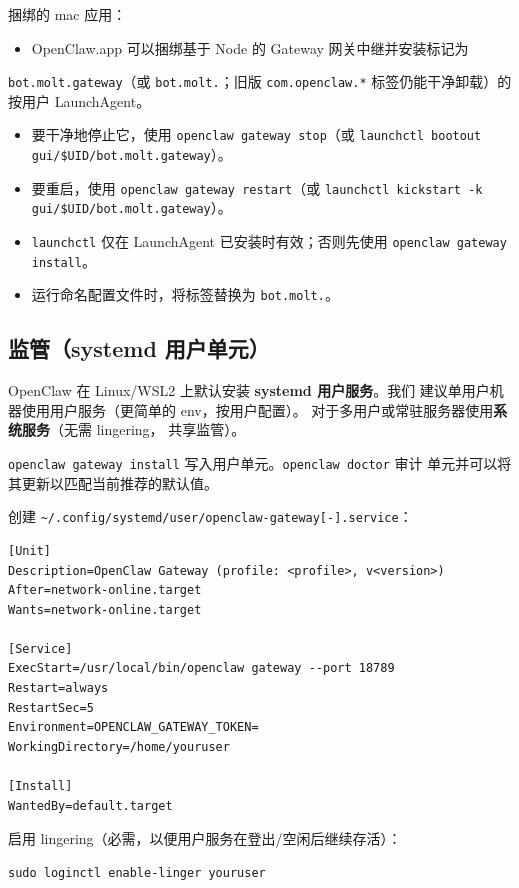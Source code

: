 捆绑的 mac 应用：

\begin{itemize}
  \item OpenClaw.app 可以捆绑基于 Node 的 Gateway 网关中继并安装标记为
\end{itemize}

\texttt{bot.molt.gateway}（或 \texttt{bot.molt.}；旧版 \texttt{com.openclaw.*} 标签仍能干净卸载）的按用户 LaunchAgent。
\begin{itemize}
  \item 要干净地停止它，使用 \texttt{openclaw gateway stop}（或 \texttt{launchctl bootout gui/\$UID/bot.molt.gateway}）。
  \item 要重启，使用 \texttt{openclaw gateway restart}（或 \texttt{launchctl kickstart -k gui/\$UID/bot.molt.gateway}）。
  \item \texttt{launchctl} 仅在 LaunchAgent 已安装时有效；否则先使用 \texttt{openclaw gateway install}。
  \item 运行命名配置文件时，将标签替换为 \texttt{bot.molt.}。
\end{itemize}


\subsection{监管（systemd 用户单元）}


OpenClaw 在 Linux/WSL2 上默认安装 \textbf{systemd 用户服务}。我们
建议单用户机器使用用户服务（更简单的 env，按用户配置）。
对于多用户或常驻服务器使用\textbf{系统服务}（无需 lingering，
共享监管）。

\texttt{openclaw gateway install} 写入用户单元。\texttt{openclaw doctor} 审计
单元并可以将其更新以匹配当前推荐的默认值。

创建 \texttt{\textasciitilde{}/.config/systemd/user/openclaw-gateway[-].service}：

\begin{lstlisting}
[Unit]
Description=OpenClaw Gateway (profile: <profile>, v<version>)
After=network-online.target
Wants=network-online.target

[Service]
ExecStart=/usr/local/bin/openclaw gateway --port 18789
Restart=always
RestartSec=5
Environment=OPENCLAW_GATEWAY_TOKEN=
WorkingDirectory=/home/youruser

[Install]
WantedBy=default.target
\end{lstlisting}


启用 lingering（必需，以便用户服务在登出/空闲后继续存活）：

\begin{lstlisting}
sudo loginctl enable-linger youruser
\end{lstlisting}


